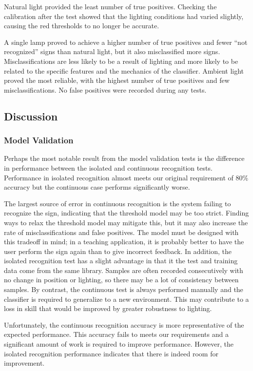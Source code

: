 \documentclass[12pt]{article}
\begin{document}
Natural light provided the least number of true positives. Checking the calibration after the test showed that the lighting conditions had varied slightly, causing the red thresholds to no longer be accurate. 

A single lamp proved to achieve a higher number of true positives and fewer “not recognized” signs than natural light, but it also misclassified more signs. Misclassifications are less likely to be a result of lighting and more likely to be related to the specific features and the mechanics of the classifier. Ambient light proved the most reliable, with the highest number of true positives and few misclassifications. No false positives were recorded during any tests.

\subsection{Discussion}

\subsubsection{Model Validation}
Perhaps the most notable result from the model validation tests is the difference in performance between the isolated and continuous recognition tests. Performance in isolated recognition almost meets our original requirement of 80\% accuracy but the continuous case performs significantly worse. 

The largest source of error in continuous recognition is the system failing to recognize the sign, indicating that the threshold model may be too strict. Finding ways to relax the threshold model may mitigate this, but it may also increase the rate of misclassifications and false positives. The model must be designed with this tradeoff in mind; in a teaching application, it is probably better to have the user perform the sign again than to give incorrect feedback.
In addition, the isolated recognition test has a slight advantage in that it the test and training data come from the same library. Samples are often recorded consecutively with no change in position or lighting, so there may be a lot of consistency between samples. By contrast, the continuous test is always performed manually and the classifier is required to generalize to a new environment. This may contribute to a loss in skill that would be improved by greater robustness to lighting.

Unfortunately, the continuous recognition accuracy is more representative of the expected performance. This accuracy fails to meets our requirements and a significant amount of work is required to improve performance. However, the isolated recognition performance indicates that there is indeed room for improvement.
\end{document}
